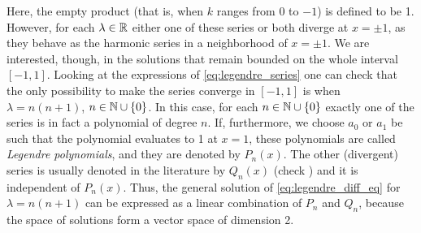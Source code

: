\documentclass[../main.tex]{subfiles}
\begin{document}
Here, the empty product (that is, when $k$ ranges from 0 to $-1$) is defined to be 1. However, for each $\lambda\in\mathbb{R}$ either one of these series or both diverge at $x=\pm 1$, as they behave as the harmonic series in a neighborhood of $x=\pm 1$. We are interested, though, in the solutions that remain bounded on the whole interval $[-1,1]$. Looking at the expressions of \cref{eq:legendre_series} one can check that the only possibility to make the series converge in $[-1,1]$ is when $\lambda =n(n+1)$, $n\in\mathbb{N}\cup\{0\}$. In this case, for each $n\in\mathbb{N}\cup\{0\}$ exactly one of the series is in fact a polynomial of degree $n$. If, furthermore, we choose $a_0$ or $a_1$ be such that the polynomial evaluates to 1 at $x=1$, these polynomials are called \emph{Legendre polynomials}, and they are denoted by $P_n(x)$. The other (divergent) series is usually denoted in the literature by $Q_n(x)$ (check \cite{mathematical_methods,florida:legendre}) and it is independent of $P_n(x)$. Thus, the general solution of \cref{eq:legendre_diff_eq} for $\lambda=n(n+1)$ can be expressed as a linear combination of $P_n$ and $Q_n$, because the space of solutions form a vector space of dimension 2.
\end{document}
